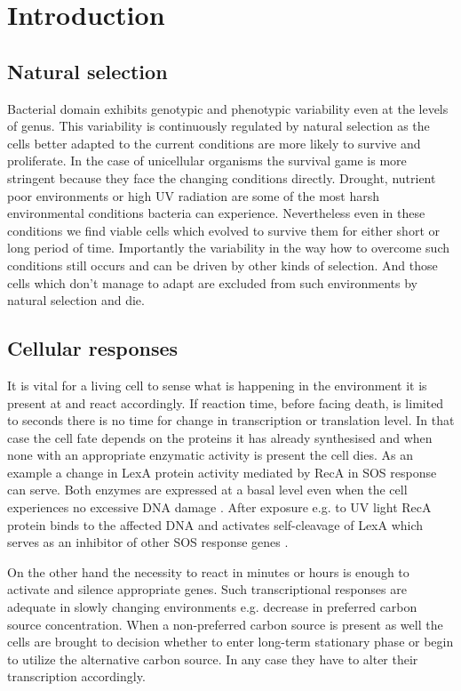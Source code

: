 \renewcommand{\chaptername}{Introduction}
\chapter*{Introduction}
\setcounter{page}{1}


\shorthandoff{-} 
\section{Natural selection}
Bacterial domain exhibits genotypic and phenotypic variability even at the levels of genus.
This variability is continuously regulated by natural selection as the cells better adapted to the current conditions are more likely to survive and proliferate.
In the case of unicellular organisms the survival game is more stringent because they face the changing conditions directly.
Drought, nutrient poor environments or high UV radiation are some of the most harsh environmental conditions bacteria can experience.
Nevertheless even in these conditions we find viable cells which evolved to survive them for either short or long period of time.
Importantly the variability in the way how to overcome such conditions still occurs and can be driven by other kinds of selection.
And those cells which don't manage to adapt are excluded from such environments by natural selection and die.


\section{Cellular responses}
It is vital for a living cell to sense what is happening in the environment it is present at and react accordingly.
If reaction time, before facing death, is limited to seconds there is no time for change in transcription or translation level.
In that case the cell fate depends on the proteins it has already synthesised and when none with an appropriate enzymatic activity is present the cell dies.
As an example a change in LexA protein activity mediated by RecA in SOS response can serve.
Both enzymes are expressed at a basal level even when the cell experiences no excessive DNA damage \cite{brent1980lexa, casaregola1982quantitative}.
After exposure e.g. to UV light RecA protein binds to the affected DNA and activates self-cleavage of LexA which serves as an inhibitor of other SOS response genes \cite{giese2008reca}.

On the other hand the necessity to react in minutes or hours is enough to activate and silence appropriate genes.
Such transcriptional responses are adequate in slowly changing environments e.g. decrease in preferred carbon source concentration.
When a non-preferred carbon source is present as well the cells are brought to decision whether to enter long-term stationary phase or begin to utilize the alternative carbon source.
In any case they have to alter their transcription accordingly.

